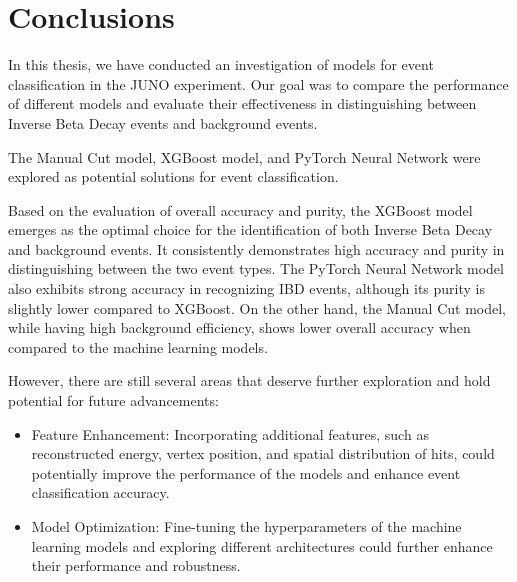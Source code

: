 \chapter{Conclusions}
In this thesis, we have conducted an investigation of models for event classification in the JUNO experiment. Our goal was to compare the performance of different models and evaluate their effectiveness in distinguishing between Inverse Beta Decay events and background events.

The Manual Cut model, XGBoost model, and PyTorch Neural Network were explored as potential solutions for event classification.

Based on the evaluation of overall accuracy and purity, the XGBoost model emerges as the optimal choice for the identification of both Inverse Beta Decay and background  events. It consistently demonstrates high accuracy and purity in distinguishing between the two event types. The PyTorch Neural Network model also exhibits strong accuracy in recognizing IBD events, although its purity is slightly lower compared to XGBoost. On the other hand, the Manual Cut model, while having high background efficiency, shows lower overall accuracy when compared to the machine learning models.

However, there are still several areas that deserve further exploration and hold potential for future advancements:
\begin{itemize}
    \item Feature Enhancement: Incorporating additional features, such as reconstructed energy, vertex position, and spatial distribution of hits, could potentially improve the performance of the models and enhance event classification accuracy.
    \item Model Optimization: Fine-tuning the hyperparameters of the machine learning models and exploring different architectures could further enhance their performance and robustness.
\end{itemize}